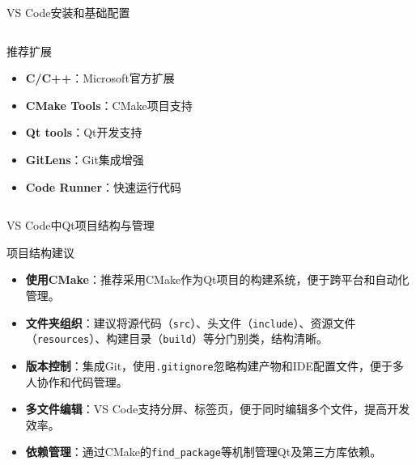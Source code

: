 \documentclass[UTF8,aspectratio=169]{beamer}
\begin{document}
\begin{frame}{VS Code安装和基础配置}
\begin{columns}
\begin{column}{0.48\textwidth}
\begin{ytublock}{推荐扩展}
                \begin{itemize}
                    \item \textbf{C/C++}：Microsoft官方扩展
                    \item \textbf{CMake Tools}：CMake项目支持
                    \item \textbf{Qt tools}：Qt开发支持
                    \item \textbf{GitLens}：Git集成增强
                    \item \textbf{Code Runner}：快速运行代码
                \end{itemize}
            \end{ytublock}
        \end{column}
    \end{columns}
\end{frame}

\begin{frame}{VS Code中Qt项目结构与管理}
    \begin{ytublock}{项目结构建议}
        \begin{itemize}
            \item \textbf{使用CMake}：推荐采用CMake作为Qt项目的构建系统，便于跨平台和自动化管理。
            \item \textbf{文件夹组织}：建议将源代码（\texttt{src}）、头文件（\texttt{include}）、资源文件（\texttt{resources}）、构建目录（\texttt{build}）等分门别类，结构清晰。
            \item \textbf{版本控制}：集成Git，使用\texttt{.gitignore}忽略构建产物和IDE配置文件，便于多人协作和代码管理。
            \item \textbf{多文件编辑}：VS Code支持分屏、标签页，便于同时编辑多个文件，提高开发效率。
            \item \textbf{依赖管理}：通过CMake的\texttt{find\_package}等机制管理Qt及第三方库依赖。
        \end{itemize}
    \end{ytublock}
\end{frame}
\end{document}
